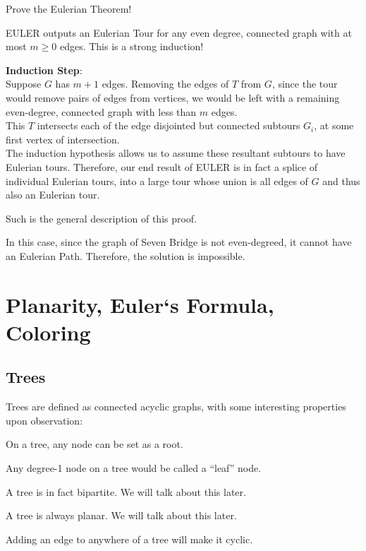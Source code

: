 \begin{ln-think}{Prove the Eulerian Theorem!}{}
\begin{bindenum}
{            EULER outputs an Eulerian Tour for any even degree, connected graph with at most $m \geq 0$ edges. This is a strong induction!
        }
        \item[] {
            \textbf{Induction Step}: \\
            Suppose $G$ has $m + 1$ edges. Removing the edges of $T$ from $G$, since the tour would remove pairs of edges from vertices, we would be left with a remaining even-degree, connected graph with less than $m$ edges. \\
            This $T$ intersects each of the edge disjointed but connected subtours $G_i$, at some first vertex of intersection. \\
            The induction hypothesis allows us to assume these resultant subtours to have Eulerian tours. Therefore, our end result of EULER is in fact a splice of individual Eulerian tours, into a large tour whose union is all edges of $G$ and thus also an Eulerian tour.
        }
    \end{bindenum}
    Such is the general description of this proof.
\end{ln-think}
In this case, since the graph of Seven Bridge is not even-degreed, it cannot have an Eulerian Path. Therefore, the solution is impossible.

\section{Planarity, Euler`s Formula, Coloring}

\subsection{Trees}
Trees are defined as connected acyclic graphs, with some interesting properties upon observation:

\begin{bindenum}
    \item On a tree, any node can be set as a root.
    \item Any degree-1 node on a tree would be called a ``leaf'' node.
    \item A tree is in fact bipartite. We will talk about this later.
    \item A tree is always planar. We will talk about this later.
    \item Adding an edge to anywhere of a tree will make it cyclic.
\end{bindenum}

